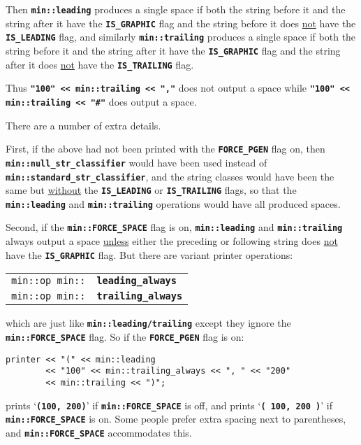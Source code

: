 \documentclass[12pt]{article}
\makeatletter
\newcommand{\TT}[1]{{\tt \bfseries #1}}
\newcommand{\ttindex}[1]{\index{#1@{\tt #1}}}
\newcommand{\EOL}{\penalty \exhyphenpenalty}
\newenvironment{indpar}[1][0.3in]%
	{\begin{list}{}%
		     {\setlength{\itemsep}{0in}%
		      \setlength{\topsep}{0in}%
		      \setlength{\parsep}{1ex}%
		      \setlength{\labelwidth}{#1}%
		      \setlength{\leftmargin}{#1}%
		      \addtolength{\leftmargin}{\labelsep}}%
	 \item}%
	{\end{list}}
\newcommand{\LABEL}[1]{\label{#1}}
\newcommand{\MINKEY}[1]%
	   {\TT{#1}\ttindex{min::#1}\ttindex{#1}}
\makeatother
\begin{document}
Then \TT{min::leading} produces a single
space if both the string before it and the string after it have
the \TT{IS\_\EOL GRAPHIC} flag and the string before it does
\underline{not} have the \TT{IS\_\EOL LEADING} flag, and
similarly \TT{min::trailing} produces a single
space if both the string before it and the string after it have
the \TT{IS\_\EOL GRAPHIC} flag and the string after it does
\underline{not} have the \TT{IS\_\EOL TRAILING} flag.

Thus \TT{"100" <{}< min::trailing <{}< ","} does not output a space
while \TT{"100" <{}< min::\EOL trail\-ing <{}< "\#"} does output a space.

There are a number of extra details.

First, if the above had not been printed with the \TT{FORCE\_\EOL PGEN}
flag on, then \TT{min::\EOL null\_\EOL str\_\EOL classifier} would have
been used instead of \TT{min::\EOL standard\_\EOL str\_\EOL classifier},
and the string classes would have been the same but \underline{without}
the \TT{IS\_\EOL LEADING} or \TT{IS\_\EOL TRAILING} flags, so that the
\TT{min::\EOL leading} and \TT{min::\EOL trailing} operations would have all
produced spaces.

Second, if the \TT{min::FORCE\_SPACE} flag is on, \TT{min::leading}
and \TT{min::trailing} always output a space \underline{unless}
either the preceding or following string does \underline{not} have
the \TT{IS\_\EOL GRAPHIC} flag.  But there are variant printer
operations:

\begin{indpar}[1em]\begin{tabular}{r@{}l}
\verb|min::op min::| & \MINKEY{leading\_always}
\LABEL{MIN::LEADING_ALWAYS} \\
\verb|min::op min::| & \MINKEY{trailing\_always}
\LABEL{MIN::TRAILING_ALWAYS} \\
\end{tabular}\end{indpar}

which are just like \TT{min::leading/trailing} except they
ignore the \TT{min::\EOL FORCE\_\EOL SPACE} flag.  So if
the \TT{FORCE\_\EOL PGEN} flag is on:

\begin{indpar}\begin{verbatim}
printer << "(" << min::leading
        << "100" << min::trailing_always << ", " << "200"
        << min::trailing << ")";
\end{verbatim}\end{indpar}
prints `\TT{(100, 200)}' if \TT{min::\EOL FORCE\_\EOL SPACE} is off, and
prints `\TT{( 100, 200 )}' if \TT{min::\EOL FORCE\_\EOL SPACE} is on.
Some people prefer extra spacing next to parentheses, and
\TT{min::\EOL FORCE\_\EOL SPACE} accommodates this.
\end{document}
